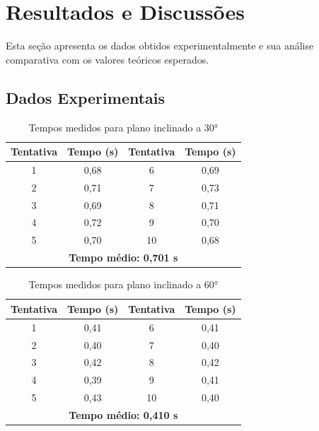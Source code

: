 \documentclass[a4paper, 12pt]{article}
\begin{document}
\section{Resultados e Discussões}
Esta seção apresenta os dados obtidos experimentalmente e sua análise comparativa com os valores teóricos esperados.

\subsection{Dados Experimentais}

\begin{table}[!htpb]
	\centering
	\caption{Tempos medidos para plano inclinado a 30°}
	\small
	\begin{tabular}{|c|c||c|c|}
		\hline
		\textbf{Tentativa} & \textbf{Tempo (s)} & \textbf{Tentativa} & \textbf{Tempo (s)} \\ \hline
		1                  & 0,68               & 6                  & 0,69               \\ \hline
		2                  & 0,71               & 7                  & 0,73               \\ \hline
		3                  & 0,69               & 8                  & 0,71               \\ \hline
		4                  & 0,72               & 9                  & 0,70               \\ \hline
		5                  & 0,70               & 10                 & 0,68               \\ \hline
		\multicolumn{4}{|c|}{\textbf{Tempo médio: 0,701 s}}                               \\ \hline
	\end{tabular}
\end{table}

\begin{table}[!htpb]
	\centering
	\caption{Tempos medidos para plano inclinado a 60°}
	\small
	\begin{tabular}{|c|c||c|c|}
		\hline
		\textbf{Tentativa} & \textbf{Tempo (s)} & \textbf{Tentativa} & \textbf{Tempo (s)} \\ \hline
		1                  & 0,41               & 6                  & 0,41               \\ \hline
		2                  & 0,40               & 7                  & 0,40               \\ \hline
		3                  & 0,42               & 8                  & 0,42               \\ \hline
		4                  & 0,39               & 9                  & 0,41               \\ \hline
		5                  & 0,43               & 10                 & 0,40               \\ \hline
		\multicolumn{4}{|c|}{\textbf{Tempo médio: 0,410 s}}                               \\ \hline
	\end{tabular}
\end{table}
\end{document}
